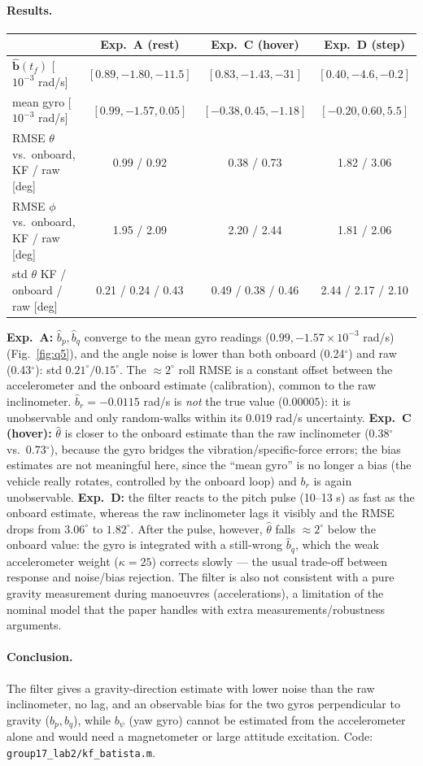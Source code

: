 \paragraph{Results.}
\begin{center}\small\begin{tabular}{lccc}\toprule
 & Exp.~A (rest) & Exp.~C (hover) & Exp.~D (step)\\\midrule
$\hat{\bm b}(t_f)$ [$10^{-3}$ rad/s] & $[0.89,-1.80,-11.5]$ & $[0.83,-1.43,-31]$ & $[0.40,-4.6,-0.2]$\\
mean gyro [$10^{-3}$ rad/s] & $[0.99,-1.57,0.05]$ & $[-0.38,0.45,-1.18]$ & $[-0.20,0.60,5.5]$\\
RMSE $\theta$ vs.\ onboard, KF / raw [deg] & 0.99 / 0.92 & 0.38 / 0.73 & 1.82 / 3.06\\
RMSE $\phi$ vs.\ onboard, KF / raw [deg] & 1.95 / 2.09 & 2.20 / 2.44 & 1.81 / 2.06\\
std $\theta$ KF / onboard / raw [deg] & 0.21 / 0.24 / 0.43 & 0.49 / 0.38 / 0.46 & 2.44 / 2.17 / 2.10\\\bottomrule
\end{tabular}\end{center}
\textbf{Exp.~A:} $\hat b_p,\hat b_q$ converge to the mean gyro readings ($0.99,-1.57\times10^{-3}$ rad/s) (Fig.~\ref{fig:q5}),
and the angle noise is lower than both onboard (0.24$^\circ$) and raw (0.43$^\circ$): std $0.21^\circ/0.15^\circ$. The
$\approx2^\circ$ roll RMSE is a constant offset between the accelerometer and the onboard estimate (calibration), common to the raw inclinometer. $\hat b_r=-0.0115$ rad/s is
\emph{not} the true value ($0.00005$): it is unobservable and only random-walks within its $0.019$ rad/s uncertainty.
\textbf{Exp.~C (hover):} $\hat\theta$ is closer to the onboard estimate than the raw inclinometer (0.38$^\circ$ vs.\ 0.73$^\circ$), because the gyro
bridges the vibration/specific-force errors; the bias estimates are not meaningful here, since the ``mean gyro'' is no longer a bias (the vehicle really rotates, controlled by the
onboard loop) and $b_r$ is again unobservable.
\textbf{Exp.~D:} the filter reacts to the pitch pulse (10--13 s) as fast as the onboard estimate, whereas the raw inclinometer lags it visibly and the
RMSE drops from $3.06^\circ$ to $1.82^\circ$. After the pulse, however, $\hat\theta$ falls $\approx2^\circ$ below the onboard value: the gyro
is integrated with a still-wrong $\hat b_q$, which the weak accelerometer weight ($\kappa=25$) corrects slowly --- the usual trade-off between response and
noise/bias rejection. The filter is also not consistent with a pure gravity measurement during manoeuvres (accelerations), a limitation of the nominal model that the paper handles with
extra measurements/robustness arguments.

\paragraph{Conclusion.} The filter gives a gravity-direction estimate with lower noise than the raw inclinometer, no lag, and an observable bias for the two gyros
perpendicular to gravity ($b_p,b_q$), while $b_\psi$ (yaw gyro) cannot be estimated from the accelerometer alone and would need a magnetometer or large
attitude excitation. Code: \texttt{group17\_lab2/kf\_batista.m}.
